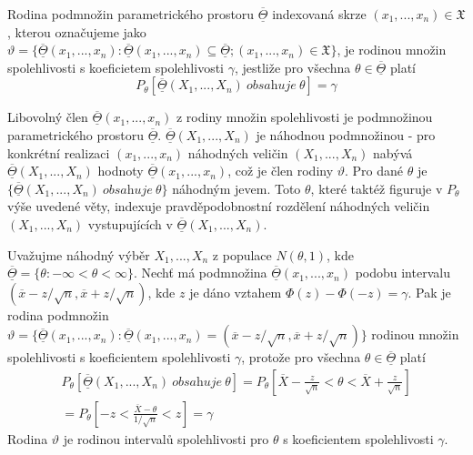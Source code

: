 \begin{definition}
Rodina podmnožin parametrického prostoru $\overline{\underline{\Theta}}$ indexovaná skrze $(x_1, ..., x_n) \in \mathfrak{X}$, kterou označujeme jako $\vartheta =\{\underline{\overline{\Theta}}(x_1, ..., x_n): \overline{\underline{\Theta}}(x_1, ..., x_n) \subseteq \overline{\underline{\Theta}}; (x_1, ..., x_n) \in \mathfrak{X}\}$, je rodinou množin spolehlivosti s koeficietem spolehlivosti $\gamma$, jestliže pro všechna $\theta \in \overline{\underline{\Theta}}$ platí
\begin{equation*}
P_{\theta}[\overline{\underline{\Theta}}(X_1, ..., X_n) ~ \textit{obsahuje} ~ \theta] = \gamma
\end{equation*}
\end{definition}

Libovolný člen $\overline{\underline{\Theta}}(x_1, ..., x_n)$ z rodiny množin spolehlivosti je podmnožinou parametrického prostoru $\overline{\underline{\Theta}}$. $\overline{\underline{\Theta}}(X_1, ..., X_n)$ je náhodnou podmnožinou - pro konkrétní realizaci $(x_1, ..., x_n)$ náhodných veličin $(X_1, ..., X_n)$ nabývá $\overline{\underline{\Theta}}(X_1, ..., X_n)$ hodnoty $\overline{\underline{\Theta}}(x_1, ..., x_n)$, což je člen rodiny $\vartheta$. Pro dané $\theta$ je $\{\overline{\underline{\Theta}}(X_1, ..., X_n) ~ \textit{obsahuje} ~ \theta\}$ náhodným jevem. Toto $\theta$, které taktéž figuruje v $P_{\theta}$ výše uvedené věty, indexuje pravděpodobnostní rozdělení náhodných veličin $(X_1, ..., X_n)$ vystupujících v $\overline{\underline{\Theta}}(X_1, ..., X_n)$.

\begin{example}
Uvažujme náhodný výběr $X_1, ..., X_n$ z populace $N(\theta, 1)$, kde $\overline{\underline{\Theta}} = \{\theta: -\infty < \theta < \infty\}$. Nechť má podmnožina $\overline{\underline{\Theta}}(x_1, ..., x_n)$ podobu intervalu $(\overline{x} - z / \sqrt{n}, \overline{x} + z / \sqrt{n})$, kde $z$ je dáno vztahem $\Phi(z) - \Phi(-z) = \gamma$. Pak je rodina podmnožin $\vartheta = \{\overline{\underline{\Theta}}(x_1, ..., x_n): \overline{\underline{\Theta}}(x_1, ..., x_n) = (\overline{x} - z / \sqrt{n}, \overline{x} + z / \sqrt{n})\}$ rodinou množin spolehlivosti s koeficientem spolehlivosti $\gamma$, protože pro všechna $\theta \in \overline{\underline{\Theta}}$ platí
\begin{multline*}
P_{\theta}[\overline{\underline{\Theta}}(X_1, ..., X_n) ~ \textit{obsahuje} ~ \theta] = P_{\theta}\left[\overline{X} - \frac{z}{\sqrt{n}} < \theta < \overline{X} + \frac{z}{\sqrt{n}}\right]\\
= P_{\theta}\left[-z < \frac{\overline{X} - \theta}{1 / \sqrt{n}} < z \right] = \gamma
\end{multline*}
Rodina $\vartheta$ je rodinou intervalů spolehlivosti pro $\theta$ s koeficientem spolehlivosti $\gamma$.
\end{example}


